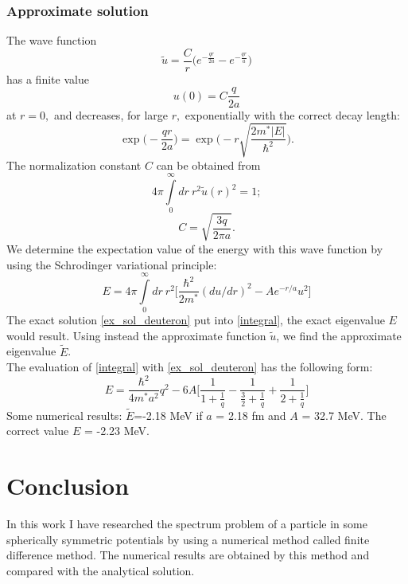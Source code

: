 \documentclass[a4paper, 12pt]{article}
\begin{document}
\subsubsection{Approximate solution}
The wave function
$$\widetilde{u} = \frac{C}{r}\displaystyle{\big(e^{-\frac{qr}{2a}} - e^{-\frac{qr}{a}}\big)} $$
has a finite value
$$u(0) = C\frac{q}{2a}$$
at $r=0,$ and decreases, for large $r,$ exponentially with the correct decay length:
$$\exp\bigg(-\frac{qr}{2a}\bigg) = \exp\bigg(-r \sqrt{\frac{2 m^* |E|}{\hbar^2}}\bigg).$$
The normalization constant $C$ can be obtained from 
$$4 \pi \displaystyle{\int\limits_{0}^ {\infty}} dr~ r^2 \widetilde{u}(r)^2 = 1;$$
\begin{equation}
    C = \sqrt{\frac{3q}{2 \pi a}}.
\end{equation}
We determine the expectation value of the energy with this wave function by using the Schrodinger variational principle:
\begin{equation}\label{integral}
    E = 4 \pi \int\limits_{0}^{\infty} dr ~r^2 \bigg[\frac{\hbar^2}{2 m^*}(du/dr)^2 -A e ^{-r/a} u^2\bigg]
\end{equation}
The exact solution \eqref{ex_sol_deuteron} put into \eqref{integral}, the exact eigenvalue $E$ would result. Using instead the approximate function $\widetilde{u}$, we find the approximate eigenvalue $\widetilde{E}$.\\
The evaluation of \eqref{integral} with \eqref{ex_sol_deuteron} has the following form:
\begin{equation}
    E = \frac{\hbar^2}{4 m^* a^2}q^2 - 6 A \bigg[\frac{1}{1 + \frac{1}{q}} - \frac{1}{\frac{3}{2} + \frac{1}{q}} +  \frac{1}{2 + \frac{1}{q}} \bigg]
\end{equation}
Some numerical results: $\widetilde{E}$=-2.18 MeV if $a$ = 2.18 fm and $A$ = 32.7 MeV. The correct value $E$ = -2.23 MeV.


\section{Conclusion}
In this work I have researched the spectrum problem of a particle in some spherically symmetric potentials by using a numerical method called finite difference method. The numerical results are obtained by this method and compared with the analytical solution. 
\end{document}
